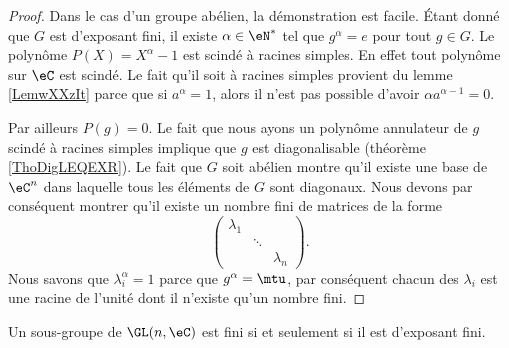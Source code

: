 \begin{proof}
    Dans le cas d'un groupe abélien, la démonstration est facile. Étant donné que \( G\) est d'exposant fini, il existe \( \alpha\in \eN^*\) tel que \( g^{\alpha}=e\) pour tout \( g\in G\). Le polynôme \( P(X)=X^{\alpha}-1\) est scindé à racines simples. En effet tout polynôme sur \( \eC\) est scindé. Le fait qu'il soit à racines simples provient du lemme \ref{LemwXXzIt} parce que si \( a^{\alpha}=1\), alors il n'est pas possible d'avoir \( \alpha a^{\alpha-1}=0\).

    Par ailleurs \( P(g)=0\). Le fait que nous ayons un polynôme annulateur de \( g\) scindé à racines simples implique que \( g\) est diagonalisable (théorème \ref{ThoDigLEQEXR}). Le fait que \( G\) soit abélien montre qu'il existe une base de \( \eC^n\) dans laquelle tous les éléments de \( G\) sont diagonaux. Nous devons par conséquent montrer qu'il existe un nombre fini de matrices de la forme
    \begin{equation}
        \begin{pmatrix}
            \lambda_1    &       &       \\
                &   \ddots    &       \\
                &       &   \lambda_n
        \end{pmatrix}.
    \end{equation}
    Nous savons que \( \lambda_i^{\alpha}=1\) parce que \( g^{\alpha}=\mtu\), par conséquent chacun des \( \lambda_i\) est une racine de l'unité dont il n'existe qu'un nombre fini.
\end{proof}

\begin{theorem}\label{ThooJLTit}
    Un sous-groupe de \( \GL(n,\eC)\) est fini si et seulement si il est d'exposant fini.
\end{theorem}

